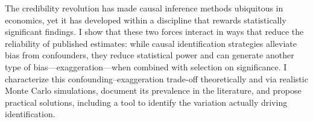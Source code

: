 The credibility revolution has made causal inference methods ubiquitous in economics, yet it has developed within a discipline that rewards statistically significant findings. I show that these two forces interact in ways that reduce the reliability of published estimates: while causal identification strategies alleviate bias from confounders, they reduce statistical power and can generate another type of bias---exaggeration---when combined with selection on significance. I characterize this confounding–exaggeration trade-off theoretically and via realistic Monte Carlo simulations, document its prevalence in the literature, and propose practical solutions, including a tool to identify the variation actually driving identification.


